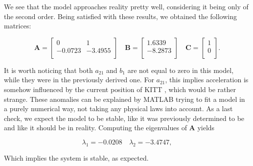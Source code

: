 \documentclass[11pt,titlepage]{report}
\begin{document}
We see that the model approaches reality pretty well, considering it being only of the second order. Being satisfied with these results, we obtained the following matrices:

\begin{equation}
	\mathbf{A} =
		\begin{bmatrix}
			0 & 1 \\
			-0.0723 & -3.4955 \\
		\end{bmatrix}
	\quad
	\mathbf{B} = 
		\begin{bmatrix}
			1.6339 \\
			-8.2873 \\
		\end{bmatrix}
		\quad
	\mathbf{C} = 
		\begin{bmatrix}
			1 \\
			0 \\
		\end{bmatrix}
	.
\end{equation}

It is worth noticing that both $a_{21}$ and $b_{1}$ are not equal to zero in this model, while they were in the previously derived one. For $a_{21}$, this implies acceleration is somehow influenced by the current position of KITT , which would be rather strange. These anomalies can be explained by MATLAB trying to fit a model in a purely numerical way, not taking any physical laws into account. As a last check, we expect the model to be stable, like it was previously determined to be and like it should be in reality. Computing the eigenvalues of $\mathbf{A}$ yields

\begin{equation}
	\lambda_1 = -0.0208 \quad \lambda_2 = -3.4747,
\end{equation}

Which implies the system is stable, as expected.
\end{document}
